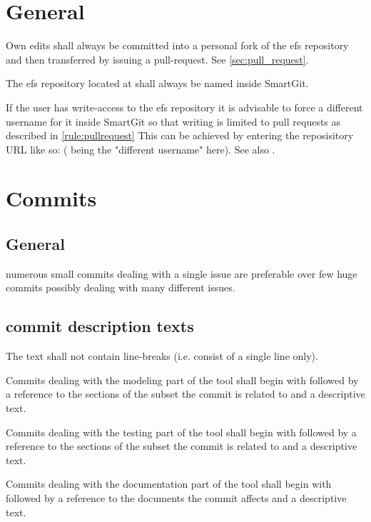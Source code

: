 \documentclass[draft]{efsguide}
\begin{document}
\section{General}
\begin{rules}
\item \label{rule:pullrequest} Own edits shall always be committed into a personal fork of the \gls{efs} repository and then transferred by issuing a pull-request. See \ref{sec:pull_request}. 
\item The \gls{efs} repository located at  shall always be named  inside SmartGit. 
\item If the user has write-access to the \gls{efs} repository it is advisable to force a different username for it inside SmartGit so that writing is limited to pull requests as described in \ref{rule:pullrequest} This can be achieved by entering the reposisitory URL like so:  ( being the "different username" here). See also \cite{gitworkflow}. 

\end{rules}


\section{Commits}
\subsection{General}
\begin{rules}
\item \label{rule:smallcommits} numerous small commits dealing with a single issue are preferable over few huge commits possibly dealing with many different issues. 
\end{rules}

\subsection{commit description texts}
\label{rules:committexts}
\begin{rules}
\item The text shall not contain line-breaks (i.e. consist of a single line only). 
\item Commits dealing with the modeling part of the tool shall begin with  followed by a reference to the sections of the subset the commit is related to and a descriptive text. 
\item Commits dealing with the testing part of the tool shall begin with  followed by a reference to the sections of the subset the commit is related to and a descriptive text. 
\item Commits dealing with the documentation part of the tool shall begin with  followed by a reference to the documents the commit affects and a descriptive text. 
\end{rules}
\end{document}
